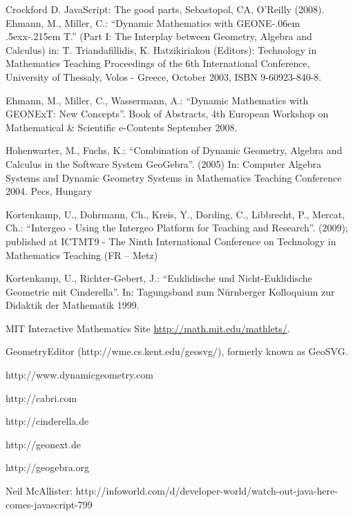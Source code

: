\documentclass[12pt,a4paper]{article}%
\def\GEONExT{GEONE\kern-.06em \lower.5ex\hbox{x}\kern-.215em T}
\begin{document}
\begin{thebibliography}{99}
     Crockford D. JavaScript: The good parts, Sebastopol, CA, O'Reilly (2008).
     Ehmann, M., Miller, C.: ``Dynamic Mathematics with \GEONExT.''
        (Part I: The Interplay between Geometry, Algebra and Calculus)
        in: T. Triandafillidis, K. Hatzikiriakou (Editors): Technology in Mathematics Teaching
        Proceedings of the 6th International Conference, University of Thessaly, Volos - Greece, October 2003, ISBN 9-60923-840-8.    
 
     Ehmann, M., Miller, C., Wassermann, A.: ``Dynamic Mathematics with GEONExT: New Concepts''. Book of Abstracts, 4th European Workshop on Mathematical \& Scientific e-Contents
    September 2008.   

     Hohenwarter, M., Fuchs, K.: ``Combination of Dynamic Geometry, Algebra and Calculus in the Software System GeoGebra''. (2005) In: Computer Algebra Systems and Dynamic Geometry Systems in Mathematics Teaching Conference 2004. Pecs, Hungary 

     Kortenkamp, U., Dohrmann, Ch., Kreis, Y., Dording, C., Libbrecht, P., Mercat, Ch.: ``Intergeo - Using the Intergeo Platform for Teaching and Research''. (2009); published at ICTMT9 - The Ninth International Conference on Technology in Mathematics Teaching (FR – Metz)

     Kortenkamp, U., Richter-Gebert, J.: ``Euklidische und Nicht-Euklidische Geometrie mit Cinderella''. In: Tagungsband zum N\"{u}rnberger Kolloquium zur Didaktik der Mathematik 1999.
    
     MIT Interactive Mathematics Site {\href{http://math.mit.edu/mathlets/}{http://math.mit.edu/mathlets/}}.
    
     GeometryEditor (http://wme.cs.kent.edu/geosvg/), formerly known as GeoSVG.
    
    
     http://www.dynamicgeometry.com
    
     http://cabri.com 
    
     http://cinderella.de 
    
     http://geonext.de 
    
     http://geogebra.org
    
     Neil McAllister: http://infoworld.com/d/developer-world/watch-out-java-here-comes-javascript-799
\end{thebibliography}
\end{document}
